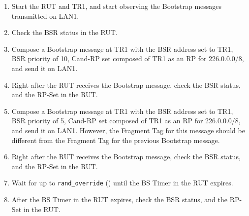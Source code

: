 \documentclass[11pt]{report}
\begin{document}
\begin{enumerate}

  \item Start the RUT and TR1, and start observing the Bootstrap messages
  transmitted on LAN1.

  \item Check the BSR status in the RUT.

  \item Compose a Bootstrap message at TR1 with the BSR address set to TR1,
  BSR priority of 10, Cand-RP set composed of TR1 as an RP for 226.0.0.0/8,
  and send it on LAN1.

  \item Right after the RUT receives the Bootstrap message, check the BSR
  status, and the RP-Set in the RUT.

  \item Compose a Bootstrap message at TR1 with the BSR address set to TR1,
  BSR priority of 5, Cand-RP set composed of TR1 as an RP for 226.0.0.0/8,
  and send it on LAN1. However, the Fragment Tag for this message should be
  different from the Fragment Tag for the previous Bootstrap message.

  \item Right after the RUT receives the Bootstrap message, check the BSR
  status, and the RP-Set in the RUT.

  \item Wait for up to \verb=rand_override= ({\PimsmRandOverride}) until the BS
  Timer in the RUT expires.

  \item After the BS Timer in the RUT expires, check the BSR status, and the
  RP-Set in the RUT.

\end{enumerate}

\end{document}
